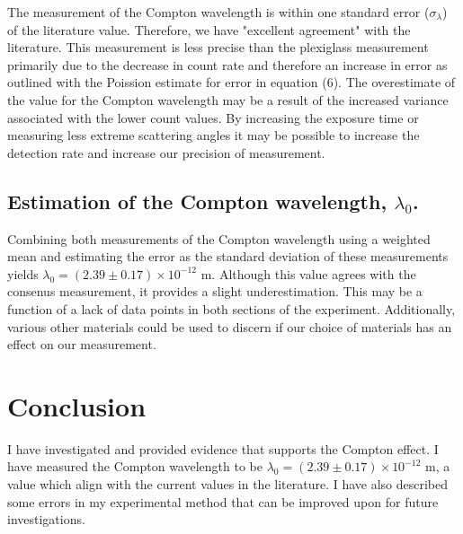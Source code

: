\documentclass{article}%
\begin{document}
The measurement of the Compton wavelength is within one standard error ($\sigma_{\lambda}$) of the literature value. \cite{NIST} Therefore, we have "excellent agreement" with the literature. \cite{HH}
This measurement is less precise than the plexiglass measurement primarily due to the decrease in count rate and therefore an increase in error as outlined with the Poission estimate for error in equation (6). The overestimate of the value for the Compton wavelength may be a result of the increased variance associated with the lower count values.
By increasing the exposure time or measuring less extreme scattering angles it may be possible to increase the detection rate and increase our precision of measurement.
\subsection{Estimation of the Compton wavelength, $\lambda_0$.}%
Combining both measurements of the Compton wavelength using a weighted mean and estimating the error as the standard deviation of these measurements yields 
$\lambda_0 = (2.39 \pm 0.17) \times 10^{-12}$ m. Although this value agrees with the consenus measurement, it provides a slight underestimation. This may be a function of a lack of data points in both sections of the experiment. Additionally, various other materials could be used to discern if our choice of materials has an effect on our measurement.

\section{Conclusion}
I have investigated and provided evidence that supports the Compton effect. I have measured the Compton wavelength to be $\lambda_0 = (2.39 \pm 0.17) \times 10^{-12}$ m, a value which align with the current values in the literature. I have also described some errors in my experimental method that can be improved upon for future investigations.
\printbibliography
\end{document}

